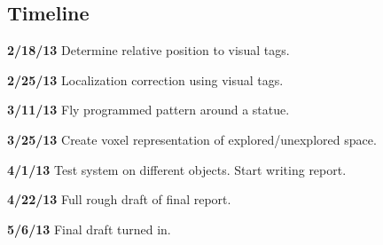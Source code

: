 \documentclass[pageno]{jpaper}
\begin{document}
\subsection{Timeline}

\textbf{2/18/13} Determine relative position to visual tags.

\textbf{2/25/13} Localization correction using visual tags.

\textbf{3/11/13} Fly programmed pattern around a statue.

\textbf{3/25/13} Create voxel representation of explored/unexplored space.

\textbf{4/1/13} Test system on different objects. Start writing report.

\textbf{4/22/13} Full rough draft of final report.

\textbf{5/6/13} Final draft turned in.




\newpage


\nocite{*}
\end{document}
